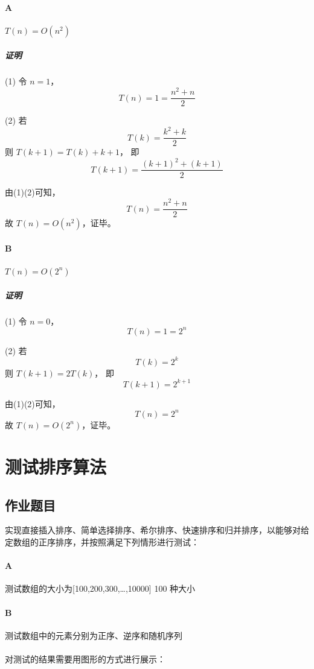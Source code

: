 \documentclass[UTF8]{ctexart}
\begin{document}
      \paragraph{A}
        $T(n) = O(n^2)$

        \subparagraph{证明}

        (1) 令 $n = 1$，
        $$T(n) = 1 = \frac {n^2 + n}{2}$$

        (2) 若
        $$T(k) = \frac {k^2 + k}{2}$$
        则 $T(k + 1) = T(k) + k + 1$， 即
        $$T(k + 1) = \frac {(k + 1)^2 + (k + 1)}{2}$$

        由(1)(2)可知，
        $$T(n) = \frac {n^2 + n}{2}$$
        故 $T(n) = O(n^2)$，证毕。

      \paragraph{B}
        $T(n) = O(2^n)$

        \subparagraph{证明}

        (1) 令 $n = 0$，
        $$T(n) = 1 = 2 ^ n$$

        (2) 若
        $$T(k) = 2 ^ k$$
        则 $T(k + 1) = 2T(k)$， 即
        $$T(k + 1) = 2 ^ {k + 1}$$

        由(1)(2)可知，
        $$T(n) = 2 ^ n$$
        故 $T(n) = O(2 ^ n)$，证毕。
  \section{测试排序算法}
    \subsection{作业题目}

    实现直接插入排序、简单选择排序、希尔排序、快速排序和归并排序，以能够对给定数组的正序排序，并按照满足下列情形进行测试：

      \paragraph{A} 测试数组的大小为[100,200,300,…,10000] 100 种大小

      \paragraph{B} 测试数组中的元素分别为正序、逆序和随机序列

      \paragraph{} 对测试的结果需要用图形的方式进行展示：
\end{document}
